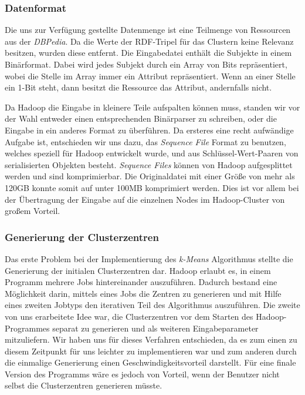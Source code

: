 \documentclass[a4paper]{llncs}
\begin{document}
\subsubsection{Datenformat}
Die uns zur Verfügung gestellte Datenmenge ist eine Teilmenge von Ressourcen aus der \emph{DBPedia}.
Da die Werte der RDF-Tripel für das Clustern keine Relevanz besitzen, wurden diese entfernt.
Die Eingabedatei enthält die Subjekte in einem Binärformat. Dabei wird jedes Subjekt durch ein Array von Bits repräsentiert, wobei die Stelle im Array immer ein Attribut repräsentiert. Wenn an einer Stelle ein 1-Bit steht, dann besitzt die Ressource das Attribut, andernfalls nicht.

Da Hadoop die Eingabe in kleinere Teile aufspalten können muss, standen wir vor der Wahl entweder einen entsprechenden Binärparser zu schreiben, oder die Eingabe in ein anderes Format zu überführen.
Da ersteres eine recht aufwändige Aufgabe ist, entschieden wir uns dazu, das \emph{Sequence File} Format zu benutzen, welches speziell für Hadoop entwickelt wurde, und aus Schlüssel-Wert-Paaren von serialisierten Objekten besteht.
\emph{Sequence Files} können von Hadoop aufgesplittet werden und sind komprimierbar. 
Die Originaldatei mit einer Größe von mehr als 120GB konnte somit auf unter 100MB komprimiert werden.
Dies ist vor allem bei der Übertragung der Eingabe auf die einzelnen Nodes im Hadoop-Cluster von großem Vorteil.

\subsubsection{Generierung der Clusterzentren}
Das erste Problem bei der Implementierung des \emph{k-Means} Algorithmus stellte die Generierung der initialen Clusterzentren dar. Hadoop erlaubt es, in einem Programm mehrere Jobs hintereinander auszuführen. Dadurch bestand eine Möglichkeit darin, mittels eines Jobs die Zentren zu generieren und mit Hilfe eines zweiten Jobtyps den iterativen Teil des Algorithmus auszuführen. Die zweite von uns erarbeitete Idee war, die Clusterzentren vor dem Starten des Hadoop-Programmes separat zu generieren und als weiteren Eingabeparameter mitzuliefern. Wir haben uns für dieses Verfahren entschieden, da es zum einen zu diesem Zeitpunkt für uns leichter zu implementieren war und zum anderen durch die einmalige Generierung einen Geschwindigkeitsvorteil darstellt. Für eine finale Version des Programms wäre es jedoch von Vorteil, wenn der Benutzer nicht selbst die Clusterzentren generieren müsste.
\end{document}
